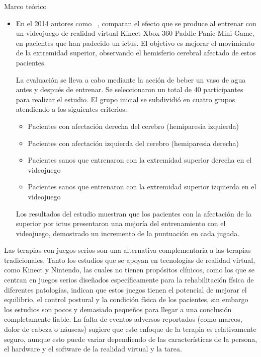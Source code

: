 \begin{thesischapter}{1} {Marco teórico}
\begin{itemize}
        \vspace{2pt}
        Un grupo de 35 pacientes se formó para la rehabilitación de las extremidades superiores en combinación con el soporte de brazo y el ejercicio, mientras que 33 pacientes realizaron la rehabilitación con los ejercicios convencionales.
        
        \item En el 2014  autores como ~\cite{10.3233/NRE-141105}, comparan el efecto que se produce al entrenar con un videojuego de realidad virtual Kinect Xbox 360 Paddle Panic Mini Game, en pacientes que han padecido un ictus. El objetivo es mejorar el movimiento de la extremidad superior, observando el hemisferio cerebral afectado de estos pacientes.

        La evaluación se lleva a cabo mediante la acción de beber un vaso de agua antes y después de entrenar. Se seleccionaron un total de 40 participantes para realizar el estudio. El grupo inicial se subdividió en cuatro grupos atendiendo a los siguientes criterios:

        \begin{itemize}
            \item Pacientes con afectación derecha del cerebro (hemiparesia izquierda)
            \item Pacientes con afectación izquierda del cerebro (hemiparesia derecha)
            \item Pacientes sanos que entrenaron con la extremidad superior derecha en el videojuego
            \item Pacientes sanos que entrenaron con la extremidad superior izquierda en el videojuego
        \end{itemize}

        Los resultados del estudio muestran que los pacientes con la afectación de la  superior por ictus presentaron una mejoría del entrenamiento con el videojuego, demostrado un incremento de la puntuación en cada jugada.
    \end{itemize}

    \vspace{5pt}
    Las terapias con juegos serios son una alternativa complementaria a las terapias tradicionales. Tanto los estudios que se apoyan en tecnologías de realidad virtual, como Kinect y Nintendo, las cuales no tienen propósitos clínicos, como los que se centran en juegos serios diseñados específicamente para la rehabilitación física de diferentes patologías, indican que estos juegos tienen el potencial de mejorar el equilibrio, el control postural y
    la condición física de los pacientes, sin embargo los estudios son pocos y demasiado pequeños para llegar a una conclusión completamente fiable. La falta de eventos adversos reportados (como mareos, dolor de cabeza o náuseas) sugiere que este enfoque de la terapia es relativamente seguro, aunque esto puede variar dependiendo de las características de la persona, el hardware y el software de la realidad virtual y la tarea. 


\end{thesischapter}
